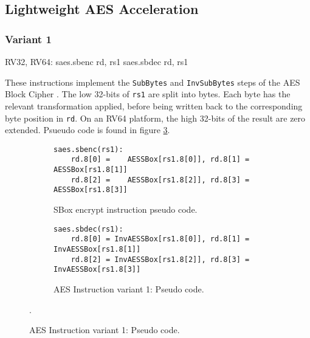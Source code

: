 
\newpage
\subsection{Lightweight AES Acceleration}




\subsubsection{Variant 1}

\begin{cryptoisa}
RV32, RV64:
    saes.sbenc rd, rs1
    saes.sbdec rd, rs1
\end{cryptoisa}

These instructions implement the 
{\tt SubBytes} \cite[Section 5.1.1]{nist:fips:197}
and
{\tt InvSubBytes} \cite[Section 5.3.1]{nist:fips:197}
steps of the AES Block Cipher \cite{nist:fips:197}.
The low 32-bits of {\tt rs1} are split into bytes.
Each byte has the relevant transformation applied, before
being written back to the corresponding byte position in {\tt rd}.
On an RV64 platform, the high 32-bits of the result are zero
extended.
Psueudo code is found in figure
\ref{fig:pseudo:aes:v1}.

\begin{figure}
\begin{subfigure}[b]{1.0\textwidth}
\begin{lstlisting}
saes.sbenc(rs1):
    rd.8[0] =    AESSBox[rs1.8[0]], rd.8[1] =    AESSBox[rs1.8[1]]
    rd.8[2] =    AESSBox[rs1.8[2]], rd.8[3] =    AESSBox[rs1.8[3]]
\end{lstlisting}
\caption{SBox encrypt instruction pseudo code.}
\label{fig:pseudo:aes:v1:sub:enc}
\end{subfigure}
\begin{subfigure}[b]{1.0\textwidth}
\begin{lstlisting}
saes.sbdec(rs1):
    rd.8[0] = InvAESSBox[rs1.8[0]], rd.8[1] = InvAESSBox[rs1.8[1]]
    rd.8[2] = InvAESSBox[rs1.8[2]], rd.8[3] = InvAESSBox[rs1.8[3]]
\end{lstlisting}
\caption{SBox decrypt instruction pseudo code.}
\label{fig:pseudo:aes:v1:sub:dec}
\caption{AES Instruction variant 1: Pseudo code.}
\end{subfigure}
\label{fig:pseudo:aes:v1}.
\end{figure}

